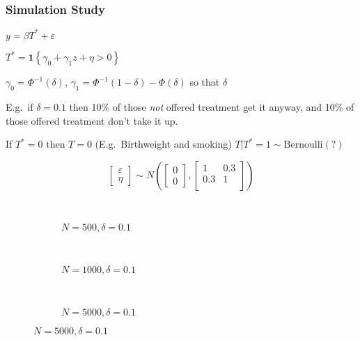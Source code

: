 \documentclass{beamer}
\begin{document}
\begin{frame}
  \frametitle{Simulation Study}
  $y = \beta T^* + \varepsilon$

  $T^* = \mathbf{1}\left\{ \gamma_0 + \gamma_1 z + \eta > 0 \right\}$

  $\gamma_0 = \Phi^{-1}(\delta)$, $\gamma_1 = \Phi^{-1}(1-\delta) - \Phi(\delta)$ so that $\delta$

  E.g.\ if $\delta=0.1$ then 10\% of those \emph{not} offered treatment get it anyway, and 10\% of those offered treatment don't take it up.
  
  If $T^*=0$ then $T=0$ (E.g.\ Birthweight and smoking)
  $T|T^*=1 \sim \mbox{Bernoulli}(?)$

  \[ \left[
  \begin{array}{c}
  \varepsilon \\ \eta
\end{array}
\right] \sim N\left( \left[
\begin{array}{c}
0 \\ 0
\end{array}
\right], \left[
\begin{array}{cc}
1 & 0.3\\
0.3 & 1 \\
\end{array}
\right]\right)\]
\end{frame}
\begin{frame}

\begin{figure}[h]
  \scriptsize

  \begingroup
  \centering
  \begin{subfigure}[b]{0.48\textwidth}
  
\label{fig:a_test}
  \end{subfigure}
  ~
  \begin{subfigure}[b]{0.48\textwidth}
  
\label{fig:b_test}
  \end{subfigure}
\endgroup
\end{figure}
\end{frame}
\begin{frame}
\begin{figure}[h]
  \scriptsize
  \begingroup
  \centering
  \begin{subfigure}[b]{0.31\textwidth}
\caption{\footnotesize $N=500, \delta = 0.1$}
  
  \end{subfigure}
  ~
  \begin{subfigure}[b]{0.31\textwidth}
    \caption{\footnotesize $N=1000, \delta = 0.1$} 
  
  \end{subfigure}
  ~
  \begin{subfigure}[b]{0.31\textwidth}
\caption{\footnotesize $N=5000, \delta = 0.1$}
  
  \end{subfigure}
\endgroup
\end{figure}
\end{frame}
\end{document}
